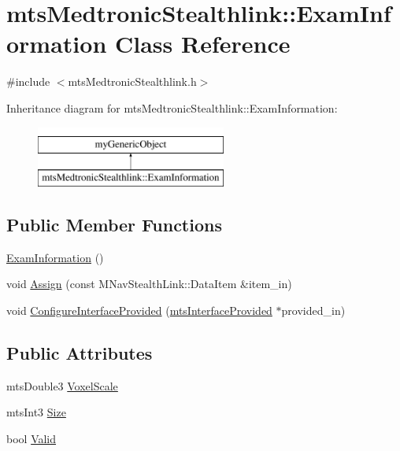 \hypertarget{classmts_medtronic_stealthlink_1_1_exam_information}{}\section{mts\+Medtronic\+Stealthlink\+:\+:Exam\+Information Class Reference}
\label{classmts_medtronic_stealthlink_1_1_exam_information}


{\ttfamily \#include $<$mts\+Medtronic\+Stealthlink.\+h$>$}

Inheritance diagram for mts\+Medtronic\+Stealthlink\+:\+:Exam\+Information\+:\begin{figure}[H]
\begin{center}
\leavevmode
\includegraphics[height=2.000000cm]{d8/d15/classmts_medtronic_stealthlink_1_1_exam_information}
\end{center}
\end{figure}
\subsection*{Public Member Functions}
\begin{DoxyCompactItemize}
\item 
\hyperlink{classmts_medtronic_stealthlink_1_1_exam_information_ac400f068b31ff7e97b8619c9a39fa509}{Exam\+Information} ()
\item 
void \hyperlink{classmts_medtronic_stealthlink_1_1_exam_information_a6fe1d1940935d92879cc0f6ba3566145}{Assign} (const M\+Nav\+Stealth\+Link\+::\+Data\+Item \&item\+\_\+in)
\item 
void \hyperlink{classmts_medtronic_stealthlink_1_1_exam_information_a48124d71b9776c4dee7637696c342029}{Configure\+Interface\+Provided} (\hyperlink{classmts_interface_provided}{mts\+Interface\+Provided} $\ast$provided\+\_\+in)
\end{DoxyCompactItemize}
\subsection*{Public Attributes}
\begin{DoxyCompactItemize}
\item 
mts\+Double3 \hyperlink{classmts_medtronic_stealthlink_1_1_exam_information_ab60d4354a0497fd3f9f9738ce9105808}{Voxel\+Scale}
\item 
mts\+Int3 \hyperlink{classmts_medtronic_stealthlink_1_1_exam_information_ac1dbe5653a197a3e7245324baca6d720}{Size}
\item 
bool \hyperlink{classmts_medtronic_stealthlink_1_1_exam_information_af540507d17d3d78b0761c07449b0a10a}{Valid}
\end{DoxyCompactItemize}
